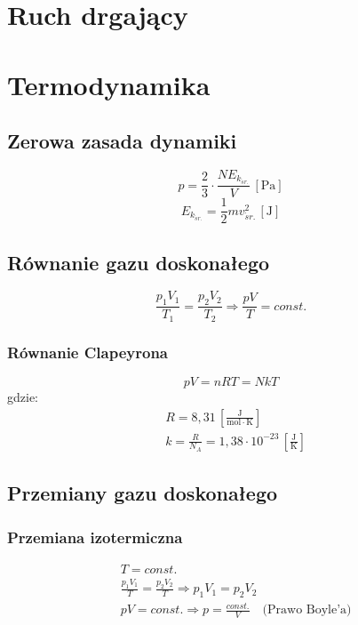 \documentclass{article}
\numberwithin{equation}{section}
\newcommand{\unit}[1]{\, \left[\mathrm{#1}\right]}
\begin{document}
  \newpage
  \section{Ruch drgający}

  \newpage
  \section{Termodynamika}
    \subsection{Zerowa zasada dynamiki}
      \begin{equation}
        p = \frac{2}{3}\cdot\frac{NE_{k_{\acute sr.}}}{V} \unit{Pa}
      \end{equation}
      \begin{equation}
        E_{k_{\acute sr.}} = \frac{1}{2}mv_{\acute sr.}^2 \unit{J}
      \end{equation}
    \subsection{Równanie gazu doskonałego}
      \begin{equation}
        \frac{p_1V_1}{T_1} = \frac{p_2V_2}{T_2} \Rightarrow \frac{pV}{T} = const.
      \end{equation}
      \subsubsection{Równanie Clapeyrona}
        \begin{equation}
          pV = nRT = NkT
        \end{equation}
        gdzie:
        \begin{align}
          &R =  8,31 \unit{\frac{J}{mol\cdot K}}\\
          &k = \frac{R}{N_A} = 1,38\cdot 10^{-23} \unit{\frac{J}{K}}
        \end{align}
    \subsection{Przemiany gazu doskonałego}
      \subsubsection{Przemiana izotermiczna}
        \begin{align}
          &T = const.\\
          &\frac{p_1V_1}{T} = \frac{p_2V_2}{T} \Rightarrow p_1V_1 = p_2V_2\\
          &pV = const. \Rightarrow p = \frac{const.}{V} \quad\text{(Prawo Boyle'a)}
        \end{align}
\end{document}
